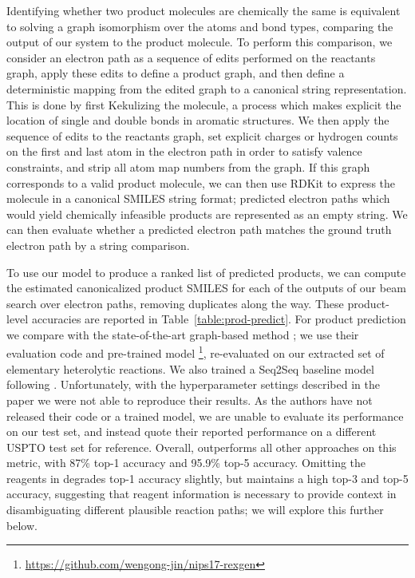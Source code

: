 Identifying whether two product molecules are chemically the same is equivalent to solving a graph isomorphism over the atoms and bond types, comparing the output of our system to the product molecule.
To perform this comparison, we consider an electron path as a sequence of edits performed on the reactants graph, apply these edits to define a product graph, 
and then define a deterministic mapping from the edited graph to a canonical string representation.
This is done by first Kekulizing the molecule, a process which makes explicit the location of single and double bonds in aromatic structures.
We then apply the sequence of edits to the reactants graph,
set explicit charges or hydrogen counts on the first and last atom in the electron path in order to satisfy valence constraints,
and strip all atom map numbers from the graph.
If this graph corresponds to a valid product molecule, we can then use RDKit to express the molecule in a canonical SMILES string format;
predicted electron paths which would yield chemically infeasible products are represented as an empty string.
We can then evaluate whether a predicted electron path matches the ground truth electron path by a string comparison.

To use our model to produce a ranked list of predicted products, we can compute the estimated canonicalized product SMILES for each of the outputs of our beam search over electron paths, removing duplicates along the way. 
These product-level accuracies are reported in Table~\ref{table:prod-predict}.
For product prediction we compare with the state-of-the-art graph-based method \cite{jin2017predicting};
we use their evaluation code and pre-trained model \footnote{\url{https://github.com/wengong-jin/nips17-rexgen}},
re-evaluated on our extracted set of elementary heterolytic reactions.
We also trained a Seq2Seq baseline model following \cite{schwaller2017found}. 
Unfortunately, with the hyperparameter settings described in the paper we were not able to reproduce their results.
As the authors have not released their code or a trained model, we are unable to evaluate its performance on our test set, and instead quote their reported performance on a different USPTO test set for reference.
Overall, \ourModelR outperforms all other approaches on this metric, with 87\% top-1 accuracy and 95.9\% top-5 accuracy.
Omitting the reagents in \ourModelR degrades top-1 accuracy slightly, but maintains a high top-3 and top-5 accuracy,
suggesting that reagent information is necessary to provide context in disambiguating different plausible reaction paths;
we will explore this further below.



